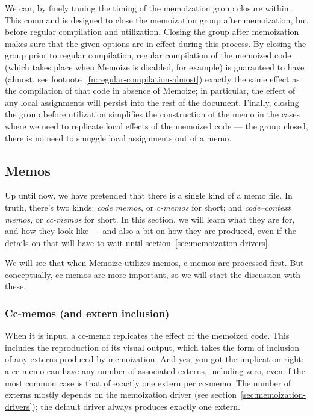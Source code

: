 \documentclass[a4paper,11pt]{article}
\begin{document}
\begin{tcolorbox}[title=\string\Memoize\ and grouping, enhanced, breakable,
    label=frame:grouping]
  We can, by finely tuning the timing of the memoization group closure within
  .  This command is designed to close the memoization group
  after memoization, but before regular compilation and utilization.  Closing
  the group after memoization makes sure that the given options are in effect
  during this process.  By closing the group prior to regular compilation,
  regular compilation of the memoized code (which takes place when Memoize is
  disabled, for example) is guaranteed to have (almost, see
  footnote~\ref{fn:regular-compilation-almost}) exactly the same effect as the
  compilation of that code in absence of Memoize; in particular, the effect of
  any local assignments will persist into the rest of the document.  Finally,
  closing the group before utilization simplifies the construction of the memo
  in the cases where we need to replicate local effects of the memoized code
  --- the group closed, there is no need to smuggle local assignments out of a
  memo.
\end{tcolorbox}

\subsection{Memos}
\label{sec:memos}

Up until now, we have pretended that there is a single kind of a memo file.  In
truth, there's two kinds: \emph{code memos}, or \emph{c-memos} for short; and
\emph{code--context memos}, or \emph{cc-memos} for short.  In this section, we
will learn what they are for, and how they look like --- and also a bit on how
they are produced, even if the details on that will have to wait until
section~\ref{sec:memoization-drivers}.

We will see that when Memoize utilizes memos, c-memos are processed first.  But
conceptually, cc-memos are more important, so we will start the discussion with
these.

\subsubsection{Cc-memos (and extern inclusion)}
\label{sec:cc-memos}

When it is input, a cc-memo replicates the effect of the memoized code.  This
includes the reproduction of its visual output, which takes the form of
inclusion of any externs produced by memoization.  And yes, you got the
implication right: a cc-memo can have any number of associated externs,
including zero, even if the most common case is that of exactly one extern per
cc-memo.  The number of externs mostly depends on the memoization driver (see
section~\ref{sec:memoization-drivers}); the default driver always produces
exactly one extern.
\end{document}
